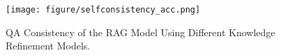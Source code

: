 \begin{figure}[t] 
\centering
    \texttt{[image: figure/selfconsistency\_acc.png]}
    \caption{QA Consistency of the RAG Model Using Different Knowledge Refinement Models.} \label{fig:selfconsistency}
\end{figure}

